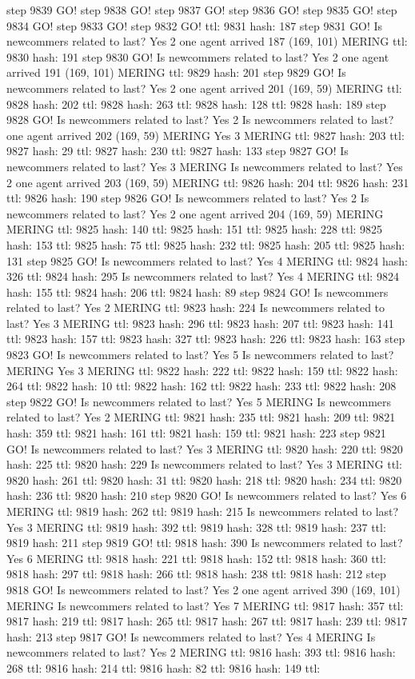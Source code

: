 step 9839 GO! step 9838 GO! step 9837 GO! step 9836 GO! step 9835 GO! step 9834 GO! step 9833 GO! step 9832 GO! ttl: 9831 hash: 187 step 9831 GO! Is newcommers related to last? Yes 2 one agent arrived 187 (169, 101) MERING ttl: 9830 hash: 191 step 9830 GO! Is newcommers related to last? Yes 2 one agent arrived 191 (169, 101) MERING ttl: 9829 hash: 201 step 9829 GO! Is newcommers related to last? Yes 2 one agent arrived 201 (169, 59) MERING ttl: 9828 hash: 202 ttl: 9828 hash: 263 ttl: 9828 hash: 128 ttl: 9828 hash: 189 step 9828 GO! Is newcommers related to last? Yes 2 Is newcommers related to last? one agent arrived 202 (169, 59) MERING Yes 3 MERING ttl: 9827 hash: 203 ttl: 9827 hash: 29 ttl: 9827 hash: 230 ttl: 9827 hash: 133 step 9827 GO! Is newcommers related to last? Yes 3 MERING Is newcommers related to last? Yes 2 one agent arrived 203 (169, 59) MERING ttl: 9826 hash: 204 ttl: 9826 hash: 231 ttl: 9826 hash: 190 step 9826 GO! Is newcommers related to last? Yes 2 Is newcommers related to last? Yes 2 one agent arrived 204 (169, 59) MERING MERING ttl: 9825 hash: 140 ttl: 9825 hash: 151 ttl: 9825 hash: 228 ttl: 9825 hash: 153 ttl: 9825 hash: 75 ttl: 9825 hash: 232 ttl: 9825 hash: 205 ttl: 9825 hash: 131 step 9825 GO! Is newcommers related to last? Yes 4 MERING ttl: 9824 hash: 326 ttl: 9824 hash: 295 Is newcommers related to last? Yes 4 MERING ttl: 9824 hash: 155 ttl: 9824 hash: 206 ttl: 9824 hash: 89 step 9824 GO! Is newcommers related to last? Yes 2 MERING ttl: 9823 hash: 224 Is newcommers related to last? Yes 3 MERING ttl: 9823 hash: 296 ttl: 9823 hash: 207 ttl: 9823 hash: 141 ttl: 9823 hash: 157 ttl: 9823 hash: 327 ttl: 9823 hash: 226 ttl: 9823 hash: 163 step 9823 GO! Is newcommers related to last? Yes 5 Is newcommers related to last? MERING Yes 3 MERING ttl: 9822 hash: 222 ttl: 9822 hash: 159 ttl: 9822 hash: 264 ttl: 9822 hash: 10 ttl: 9822 hash: 162 ttl: 9822 hash: 233 ttl: 9822 hash: 208 step 9822 GO! Is newcommers related to last? Yes 5 MERING Is newcommers related to last? Yes 2 MERING ttl: 9821 hash: 235 ttl: 9821 hash: 209 ttl: 9821 hash: 359 ttl: 9821 hash: 161 ttl: 9821 hash: 159 ttl: 9821 hash: 223 step 9821 GO! Is newcommers related to last? Yes 3 MERING ttl: 9820 hash: 220 ttl: 9820 hash: 225 ttl: 9820 hash: 229 Is newcommers related to last? Yes 3 MERING ttl: 9820 hash: 261 ttl: 9820 hash: 31 ttl: 9820 hash: 218 ttl: 9820 hash: 234 ttl: 9820 hash: 236 ttl: 9820 hash: 210 step 9820 GO! Is newcommers related to last? Yes 6 MERING ttl: 9819 hash: 262 ttl: 9819 hash: 215 Is newcommers related to last? Yes 3 MERING ttl: 9819 hash: 392 ttl: 9819 hash: 328 ttl: 9819 hash: 237 ttl: 9819 hash: 211 step 9819 GO! ttl: 9818 hash: 390 Is newcommers related to last? Yes 6 MERING ttl: 9818 hash: 221 ttl: 9818 hash: 152 ttl: 9818 hash: 360 ttl: 9818 hash: 297 ttl: 9818 hash: 266 ttl: 9818 hash: 238 ttl: 9818 hash: 212 step 9818 GO! Is newcommers related to last? Yes 2 one agent arrived 390 (169, 101) MERING Is newcommers related to last? Yes 7 MERING ttl: 9817 hash: 357 ttl: 9817 hash: 219 ttl: 9817 hash: 265 ttl: 9817 hash: 267 ttl: 9817 hash: 239 ttl: 9817 hash: 213 step 9817 GO! Is newcommers related to last? Yes 4 MERING Is newcommers related to last? Yes 2 MERING ttl: 9816 hash: 393 ttl: 9816 hash: 268 ttl: 9816 hash: 214 ttl: 9816 hash: 82 ttl: 9816 hash: 149 ttl: 